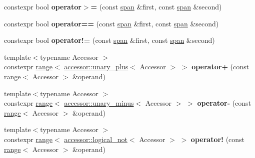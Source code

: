 \begin{DoxyCompactItemize}
\item 
\mbox{\label{namespacegko_af6a579660b1a1d65b353ede9ab691730}} 
constexpr bool {\bfseries operator$>$=} (const \hyperlink{structgko_1_1span}{span} \&first, const \hyperlink{structgko_1_1span}{span} \&second)
\item 
\mbox{\label{namespacegko_afa4fd5d9324b20d7205d3cc6ab610444}} 
constexpr bool {\bfseries operator==} (const \hyperlink{structgko_1_1span}{span} \&first, const \hyperlink{structgko_1_1span}{span} \&second)
\item 
\mbox{\label{namespacegko_a76b572cdf444e58282049b6eeed87f0a}} 
constexpr bool {\bfseries operator!=} (const \hyperlink{structgko_1_1span}{span} \&first, const \hyperlink{structgko_1_1span}{span} \&second)
\item 
\mbox{\label{namespacegko_ac794f6c0cb0e1252d2326feebae6ba56}} 
{\footnotesize template$<$typename Accessor $>$ }\\constexpr \hyperlink{classgko_1_1range}{range}$<$ \hyperlink{structgko_1_1accessor_1_1unary__plus}{accessor\+::unary\+\_\+plus}$<$ Accessor $>$ $>$ {\bfseries operator+} (const \hyperlink{classgko_1_1range}{range}$<$ Accessor $>$ \&operand)
\item 
\mbox{\label{namespacegko_acdb7f55a089dea8a02ce13d570894253}} 
{\footnotesize template$<$typename Accessor $>$ }\\constexpr \hyperlink{classgko_1_1range}{range}$<$ \hyperlink{structgko_1_1accessor_1_1unary__minus}{accessor\+::unary\+\_\+minus}$<$ Accessor $>$ $>$ {\bfseries operator-\/} (const \hyperlink{classgko_1_1range}{range}$<$ Accessor $>$ \&operand)
\item 
\mbox{\label{namespacegko_a1b0174e1e36ef6c8561108174e35a1b6}} 
{\footnotesize template$<$typename Accessor $>$ }\\constexpr \hyperlink{classgko_1_1range}{range}$<$ \hyperlink{structgko_1_1accessor_1_1logical__not}{accessor\+::logical\+\_\+not}$<$ Accessor $>$ $>$ {\bfseries operator!} (const \hyperlink{classgko_1_1range}{range}$<$ Accessor $>$ \&operand)
\item 
\mbox{\label{namespacegko_a69778756c37d99881afbd0ec6203db60}} 

\end{DoxyCompactItemize}
